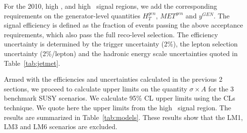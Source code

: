 For the 2010, high \met, and high \Ht\ signal regions, we add the corresponding
requirements on the generator-level quantities $H_{T}^{gen}$, $MET^{gen}$ and $y^{GEN}$.
The signal efficiency is defined as the fraction of events passing the above acceptance requirements, which
also pass the full reco-level selection. The efficiency uncertainty is determined by the trigger uncertainty (2\%),
the lepton selection uncertainty (2\%/lepton) and the hadronic energy scale uncertainties quoted in Table~\ref{tab:jetmet}.

Armed with the efficiencies and uncertainties calculated in the previous 2 sections, we proceed
to calculate upper limits on the quantity $\sigma \times A$ for the 3 benchmark SUSY 
scenarios. We calculate  95\% CL upper
limits using the CLs technique.
We quote here the upper limits from the high \Ht\ signal region.
The results are summarized in
Table~\ref{tab:models}. These results show that the LM1, LM3 and LM6 scenarios are excluded.

